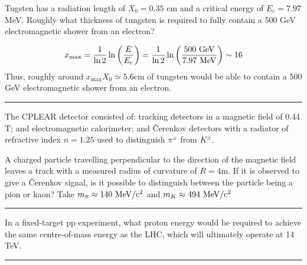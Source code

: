 
\begin{problem}{1.8}
Tugsten has a radiation length of $X_0=0.35$ cm and a critical energy of $E_c = 7.97$ MeV. Roughly what thickness of tungsten is required to fully contain a 500 GeV electromagnetic shower from an electron?
\end{problem}
\begin{solution}
\begin{align*}
    x_{\text{max}} = \frac{1}{\ln 2}\ln\left( \frac{E}{E_c}\right) = \frac{1}{\ln 2}\ln\left( \frac{500 \text{ GeV}}{7.97 \text{ MeV}}\right) \sim 16
\end{align*}
Thus, roughly around $x_\text{max}X_0 \simeq 5.6 \unit{\centi\metre}$ of tungsten would be able to contain a 500 GeV electromagnetic shower from an electron.\\
\end{solution} 
\noindent\rule{7in}{1.5pt}


\begin{problem}{1.9}
The CPLEAR detector consisted of: tracking detectors in a magnetic field of 0.44 T; and electromagnetic calorimeter;
and Čerenkov detectors with a radiator of refractive index $n=1.25$ used to distinguish $\pi^\pm$ from $K^\pm$.

A charged particle travelling perpendicular to the direction of the magnetic field leaves a track with a
measured radius of curvature of $R=4$m. If it is observed to give a Čerenkov signal, is it 
possible to distinguish between the particle being a pion or kaon? Take $m_\pi \approx 140 \text{ MeV} /\text{c}^2$ and $m_K \approx 494 \text{ MeV} /\text{c}^2$ 
\end{problem}
\begin{solution}

\end{solution}

\noindent\rule{7in}{1.5pt}


\begin{problem}{1.10}
In a fixed-target pp experiment, what proton energy would be required to achieve the same centre-of-mass energy as the LHC, which will ultimately operate at 14 TeV.
\end{problem}
\begin{solution}
    
\end{solution} 
\noindent\rule{7in}{1.5pt}
    
